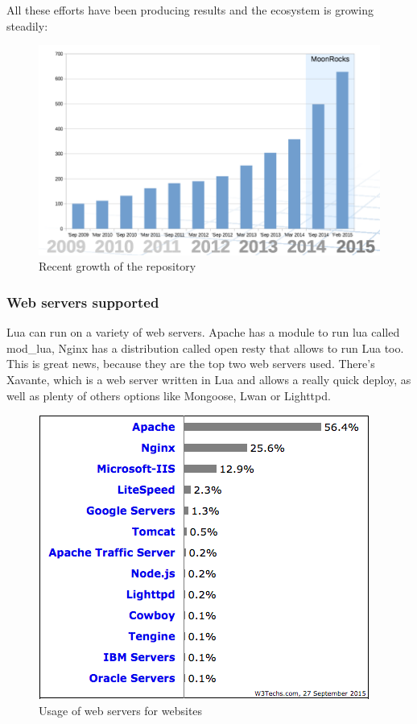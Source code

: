\documentclass{article}
\begin{document}
All these efforts have been producing results and the ecosystem is growing steadily\autocite{luarockspresentation}: \\
\begin{figure}[h]
\centering\includegraphics[scale=0.5]{luamodules.png}
\caption{\label{fig:luamodules} Recent growth of the repository}
\end{figure}

\subsubsection{Web servers supported}

Lua can run on a variety of web servers. Apache has a module to run lua called mod\_lua, Nginx has a distribution called open resty that allows to run Lua too. This is great news, because they are the top two web servers used\autocite{webservers}. There’s Xavante, which is a web server written in Lua and allows a really quick deploy, as well as plenty of others options like Mongoose, Lwan or Lighttpd. 
\begin{figure}[h]
\centering\includegraphics[scale=0.7]{webservers.png}
\caption{\label{fig:webservers} Usage of web servers for websites}
\end{figure}
\end{document}
